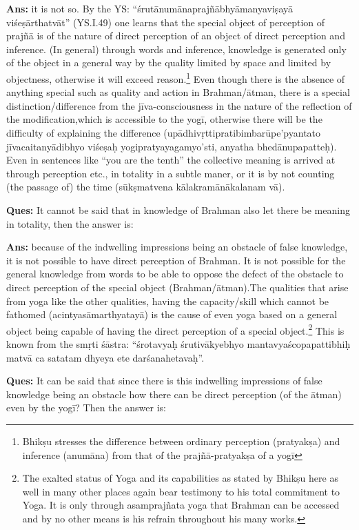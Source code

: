 \textbf{Ans:}  it is not so.  By the YS: “śrutānumānaprajñābhyāmanyaviṣayā viśeṣārthatvāt” (YS.I.49) one learns that the special object of perception of prajñā is of the nature of direct perception of an object of direct perception and inference. (In general) through words and inference, knowledge is generated only of the object in a general way by the quality limited by space and limited by objectness, otherwise it will exceed reason.\footnote{Bhikṣu stresses the difference between ordinary perception (pratyakṣa) and inference (anumāna) from that of the prajñā-pratyakṣa of a yogī} Even though there is the absence of anything special such as quality and action in Brahman/ātman, there is a  special distinction/difference from the jīva-consciousness in the nature of the reflection of the modification,which is accessible to the yogī, otherwise there will be the difficulty of explaining the difference (upādhivṛttipratibimbarūpe’pyantato jīvacaitanyādibhyo viśeṣaḥ yogipratyayagamyo’sti, anyatha bhedānupapatteḥ). Even in sentences like “you are the tenth” the collective meaning is arrived at through perception etc., in totality in a subtle maner, or it is by not counting (the passage of) the time (sūkṣmatvena kālakramānākalanam vā).

\textbf{Ques:} It cannot be said that in knowledge of Brahman also let there be meaning in totality, then the answer is: 

\textbf{Ans:} because of the indwelling impressions being an obstacle of false knowledge, it is not possible to have direct perception of Brahman. It is not possible for the general knowledge from words to be able to oppose the defect of the obstacle to direct perception of the special object (Brahman/ātman).The qualities that arise from yoga like the other qualities, having the capacity/skill which cannot be fathomed (acintyasāmarthyatayā) is the cause of even yoga based on a general object being capable of  having the direct perception of a special object.\footnote{The exalted status of Yoga and its capabilities as stated by Bhikṣu here as well in many other places again bear testimony to his total commitment to Yoga. It is only through asamprajñata yoga that Brahman can be accessed and by no other means is his refrain throughout his many works.} This is known from the smṛti śāstra: “śrotavyaḥ śrutivākyebhyo mantavyaścopapattibhiḥ matvā ca satatam dhyeya ete darśanahetavaḥ”.

\textbf{Ques:} It can be said that since there is this indwelling impressions of false knowledge being an obstacle how there can be direct perception (of the ātman) even by the yogī? Then the answer is:

